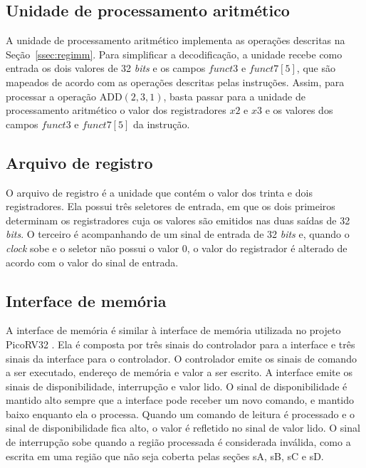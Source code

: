 \subsection{Unidade de processamento aritmético}
\label{ssec:upa}

A unidade de processamento aritmético implementa as operações descritas na Seção~\ref{ssec:regimm}. Para simplificar
a decodificação, a unidade recebe como entrada os dois valores de 32 \emph{bits} e os campos $funct3$ e $funct7[5]$, que
são mapeados de acordo com as operações descritas pelas instruções. Assim, para processar a operação ADD$(2, 3, 1)$,
basta passar para a unidade de processamento aritmético o valor dos registradores $x2$ e $x3$ e os valores dos
campos $funct3$ e $funct7[5]$ da instrução.

\subsection{Arquivo de registro}
\label{ssec:memfile}

O arquivo de registro é a unidade que contém o valor dos trinta e dois registradores. Ela possui três seletores de entrada, em que
os dois primeiros determinam os registradores cuja os valores são emitidos nas duas saídas de 32 \emph{bits}. O terceiro
é acompanhando de um sinal de entrada de 32 \emph{bits} e, quando o \emph{clock} sobe e o seletor não possui o valor 0,
o valor do registrador é alterado de acordo com o valor do sinal de entrada.

\subsection{Interface de memória}
\label{ssec:memint}

A interface de memória é similar à interface de memória utilizada no projeto PicoRV32 \citep{picorv}.
Ela é composta por três sinais do controlador para a interface e três sinais da interface para o controlador.
O controlador emite os sinais de comando a ser executado, endereço de memória e valor a ser escrito.
A interface emite os sinais de disponibilidade, interrupção e valor lido.
O sinal de disponibilidade é mantido alto sempre que a interface pode receber um novo comando, e
mantido baixo enquanto ela o processa. Quando um comando de leitura é processado e o sinal de
disponibilidade fica alto, o valor é refletido no sinal de valor lido. O sinal de interrupção
sobe quando a região processada é considerada inválida, como a escrita em uma região que não seja
coberta pelas seções sA, sB, sC e sD.

